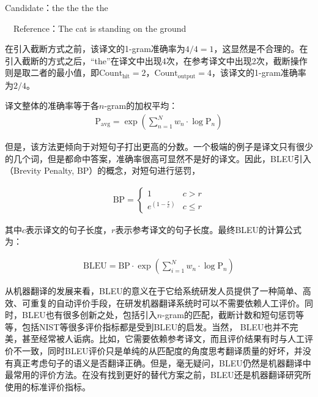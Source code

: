 \begin{example}
Candidate：the the the the

\qquad \qquad \ \  Reference：The cat is standing on the ground
\label{eg:1-1}
\end{example}

\parinterval 在引入截断方式之前，该译文的1-gram准确率为$4/4=1$，这显然是不合理的。在引入截断的方式之后，``the''在译文中出现4次，在参考译文中出现2次，截断操作则是取二者的最小值，即$\textrm{Count}_{\textrm{hit}}= 2$，$\textrm{Count}_{\textrm{output}}= 4$，该译文的1-gram准确率为$2/4$。

\parinterval 译文整体的准确率等于各$n$-gram的加权平均：
\begin{eqnarray}
\textrm{P}_{\textrm{avg}}=\exp(\sum_{n=1}^Nw_n\cdot \log{\textrm{P}_n})
\label{eq:1-2}
\end{eqnarray}

\parinterval 但是，该方法更倾向于对短句子打出更高的分数。一个极端的例子是译文只有很少的几个词，但是都命中答案，准确率很高可显然不是好的译文。因此，BLEU引入{\small{}}（Brevity Penalty, BP）的概念，对短句进行惩罚，

\begin{eqnarray}
\textrm{BP}=
\begin{cases}
1& c>r\\
e^{(1-\frac{r}{c})}& c \le r
\end{cases}
\label{eq:1-3}
\end{eqnarray}

\noindent 其中$c$表示译文的句子长度，$r$表示参考译文的句子长度。最终BLEU的计算公式为：

\begin{eqnarray}
\textrm{BLEU}=\textrm{BP} \cdot \exp(\sum_{i=1}^{N}w_n \cdot \log{\textrm{P}_n})
\label{eq:1-4}
\end{eqnarray}

\parinterval 从机器翻译的发展来看，BLEU的意义在于它给系统研发人员提供了一种简单、高效、可重复的自动评价手段，在研发机器翻译系统时可以不需要依赖人工评价。同时，BLEU也有很多创新之处，包括引入$n$-gram的匹配，截断计数和短句惩罚等等，包括NIST等很多评价指标都是受到BLEU的启发。当然， BLEU也并不完美，甚至经常被人诟病。比如，它需要依赖参考译文，而且评价结果有时与人工评价不一致，同时BLEU评价只是单纯的从匹配度的角度思考翻译质量的好坏，并没有真正考虑句子的语义是否翻译正确。但是，毫无疑问，BLEU仍然是机器翻译中最常用的评价方法。在没有找到更好的替代方案之前，BLEU还是机器翻译研究所使用的标准评价指标。

